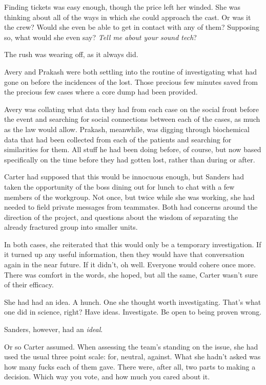 Finding tickets was easy enough, though the price left her winded. She was thinking about all of the ways in which she could approach the cast. Or was it the crew? Would she even be able to get in contact with any of them? Supposing so, what would she even say? \emph{Tell me about your sound tech}?

The rush was wearing off, as it always did.

Avery and Prakash were both settling into the routine of investigating what had gone on before the incidences of the lost. Those precious few minutes saved from the precious few cases where a core dump had been provided.

Avery was collating what data they had from each case on the social front before the event and searching for social connections between each of the cases, as much as the law would allow. Prakash, meanwhile, was digging through biochemical data that had been collected from each of the patients and searching for similarities for them. All stuff he had been doing before, of course, but now based specifically on the time before they had gotten lost, rather than during or after.

Carter had supposed that this would be innocuous enough, but Sanders had taken the opportunity of the boss dining out for lunch to chat with a few members of the workgroup. Not once, but twice while she was working, she had needed to field private messages from teammates. Both had concerns around the direction of the project, and questions about the wisdom of separating the already fractured group into smaller units.

In both cases, she reiterated that this would only be a temporary investigation. If it turned up any useful information, then they would have that conversation again in the near future. If it didn't, oh well. Everyone would cohere once more. There was comfort in the words, she hoped, but all the same, Carter wasn't sure of their efficacy.

She had had an idea. A hunch. One she thought worth investigating. That's what one did in science, right? Have ideas. Investigate. Be open to being proven wrong.

Sanders, however, had an \emph{ideal}.

Or so Carter assumed. When assessing the team's standing on the issue, she had used the usual three point scale: for, neutral, against. What she hadn't asked was how many fucks each of them gave. There were, after all, two parts to making a decision. Which way you vote, and how much you cared about it.

